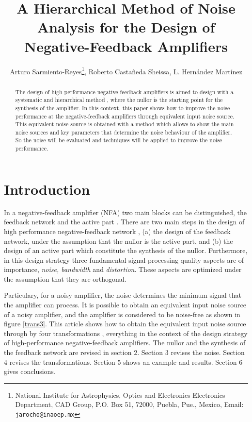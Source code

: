 \documentclass[letterpaper]{ecctd01}
\title{A Hierarchical Method of Noise Analysis for the Design of Negative-Feedback Amplifiers}
\author{Arturo Sarmiento-Reyes\footnote{National Institute for Astrophysics, Optics and Electronics
Electronics Department, CAD Group, P.O. Box 51, 72000, Puebla, Pue., Mexico, Email: {\tt jarocho@inaoep.mx}},
Roberto Casta\~neda Sheissa\footnotemark[1], L. Hern\'andez Mart\'inez\footnotemark[1]}
\begin{document}

\maketitle

\begin{abstract}
The design of high-performance negative-feedback amplifiers is aimed to design with a systematic and hierarchical method \cite{nordholt1}, where the nullor is the starting point for the synthesis of the amplifier. In this context, this paper shows how to improve the noise performance at the negative-feedback amplifiers through equivalent input noise source. This equivalent noise source is obtained with a method which allows to show the main noise sources and key parameters that determine the noise behaviour of the amplifier. So the noise will be evaluated and techniques will be applied to improve the noise performance.
\end{abstract}

\section{Introduction}

In a negative-feedback amplifier (NFA) two main blocks can be distinguished, the feedback network and the active part \cite{gray}. There are two main steps in the design of high performance negative-feedback network \cite{nordholt}, (a) the design of the feedback network, under the assumption that the nullor is the active part, and (b) the design of an active part which constitute the synthesis of the nullor. Furthermore, in this design strategy three fundamental signal-processing quality aspects are of importance, {\it{noise, bandwidth}} and {\it{distortion}}. These aspects are optimized under the assumption that they are orthogonal.

Particulary, for a noisy amplifier, the noise determines the minimum signal that the amplifier can process. It is possible to obtain an equivalent input noise source \cite{netzer,chang} of a noisy amplifier, and the amplifier is considered to be noise-free as shown in figure \ref{trans3}. This article shows how to obtain the equivalent input noise source through by four transformations \cite{gilbert}, everything in the context of the design strategy of high-performance negative-feedback amplifiers. The nullor and the synthesis of the feedback network are revised in section 2. Section 3 revises the noise. Section 4 revises the transformations. Section 5 shows an example and results. Section 6 gives conclusions.
\end{document}
